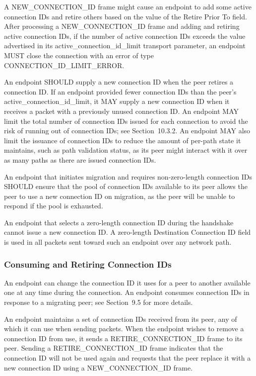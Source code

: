 \documentclass{article}
\begin{document}
A NEW\_CONNECTION\_ID frame might cause an endpoint to add some active connection IDs and retire others based on the value of the Retire Prior To field.  After processing a NEW\_CONNECTION\_ID frame and adding and retiring active connection IDs, if the number of active connection IDs exceeds the value advertised in its active\_connection\_id\_limit transport parameter, an endpoint MUST close the connection with an error of type CONNECTION\_ID\_LIMIT\_ERROR.

An endpoint SHOULD supply a new connection ID when the peer retires a connection ID.  If an endpoint provided fewer connection IDs than the peer's active\_connection\_id\_limit, it MAY supply a new connection ID when it receives a packet with a previously unused connection ID.  An endpoint MAY limit the total number of connection IDs issued for each connection to avoid the risk of running out of connection IDs; see Section~10.3.2.  An endpoint MAY also limit the issuance of connection IDs to reduce the amount of per-path state it maintains, such as path validation status, as its peer might interact with it over as many paths as there are issued connection IDs.

An endpoint that initiates migration and requires non-zero-length connection IDs SHOULD ensure that the pool of connection IDs available to its peer allows the peer to use a new connection ID on migration, as the peer will be unable to respond if the pool is exhausted.

An endpoint that selects a zero-length connection ID during the handshake cannot issue a new connection ID.  A zero-length Destination Connection ID field is used in all packets sent toward such an endpoint over any network path.

\subsubsection{Consuming and Retiring Connection IDs}

An endpoint can change the connection ID it uses for a peer to another available one at any time during the connection.  An endpoint consumes connection IDs in response to a migrating peer; see Section~9.5 for more details.

An endpoint maintains a set of connection IDs received from its peer, any of which it can use when sending packets.  When the endpoint wishes to remove a connection ID from use, it sends a RETIRE\_CONNECTION\_ID frame to its peer.  Sending a RETIRE\_CONNECTION\_ID frame indicates that the connection ID will not be used again and requests that the peer replace it with a new connection ID using a NEW\_CONNECTION\_ID frame.
\end{document}
